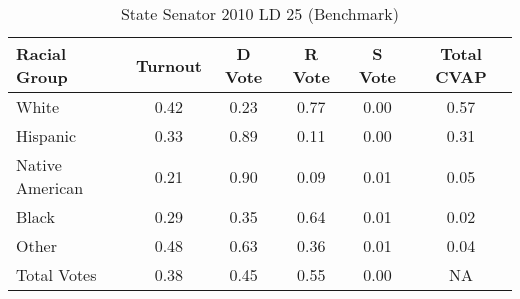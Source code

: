 \begin{table}[htb]
\begin{center}
\caption{State Senator 2010 LD 25 (Benchmark)}
\label{stsen10_cvap_ld_25_benchmark}
\begin{tabular}{lccccc}
  \hline
Racial Group & Turnout & D Vote & R Vote & S Vote & Total CVAP \\ 
  \hline
 White & 0.42  & 0.23  & 0.77  & 0.00  & 0.57 \\
    Hispanic & 0.33  & 0.89  & 0.11  & 0.00  & 0.31 \\
    Native American & 0.21  & 0.90  & 0.09  & 0.01  & 0.05 \\
    Black & 0.29  & 0.35  & 0.64  & 0.01  & 0.02 \\
    Other & 0.48  & 0.63  & 0.36  & 0.01  & 0.04 \\
    Total Votes & 0.38  & 0.45  & 0.55  & 0.00  &  NA \\
   \hline
\end{tabular}
\end{center}
\end{table}